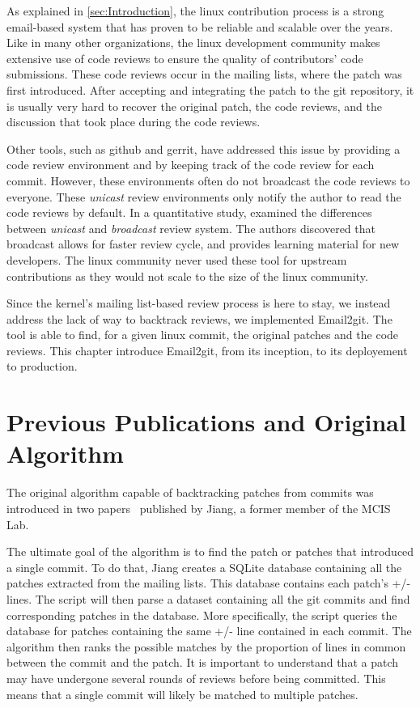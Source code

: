 \label{sec:Theme2}

As explained in \autoref{sec:Introduction}, the linux contribution process is a strong email-based system that has proven to be reliable and scalable over the years. Like in many other organizations, the linux development community makes extensive use of code reviews to ensure the quality of contributors' code submissions. These code reviews occur in the mailing lists, where the patch was first introduced. After accepting and integrating the patch to the git repository, it is usually very hard to recover the original patch, the code reviews, and the discussion that took place during the code reviews. 

Other tools, such as github and gerrit, have addressed this issue by providing a code review environment and by keeping track of the code review for each commit. However, these environments often do not broadcast the code reviews to everyone. These \textit{unicast} review environments only notify the author to read the code reviews by default. In a quantitative study, \citep{armstrong} examined the differences between \textit{unicast} and \textit{broadcast} review system. The authors discovered that broadcast allows for faster review cycle, and provides learning material for new developers. The linux community never used these tool for upstream contributions as they would not scale to the size of the linux community. 


Since the kernel's mailing list-based review process is here to stay, we instead address the lack of way to backtrack reviews, we implemented Email2git. The tool is able to find, for a given linux commit, the original patches and the code reviews. This chapter introduce Email2git, from its inception, to its deployement to production. 

\section{Previous Publications and Original Algorithm}

The original algorithm capable of backtracking patches from commits was introduced in two papers~\citep{msr13jojo,jiang14} published by Jiang, a former member of the MCIS Lab.

The ultimate goal of the algorithm is to find the patch or patches that introduced a single commit. To do that, Jiang creates a SQLite database containing all the patches extracted from the mailing lists. This database contains each patch's +/- lines. The script will then parse a dataset containing all the git commits and find corresponding patches in the database. More specifically, the script queries the database for patches containing the same +/- line contained in each commit. The algorithm then ranks the possible matches by the proportion of lines in common between the commit and the patch. It is important to understand that a patch may have undergone several rounds of reviews before being committed. This means that a single commit will likely be matched to multiple patches. 

